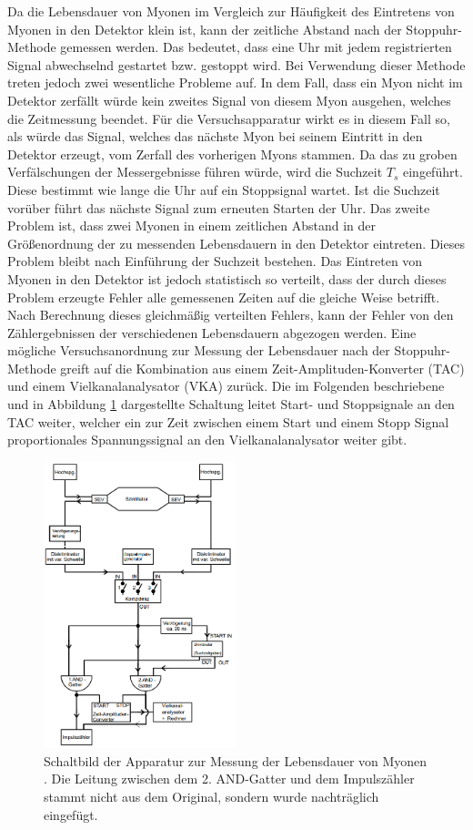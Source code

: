 Da die Lebensdauer von Myonen im Vergleich zur Häufigkeit des Eintretens von Myonen in den Detektor klein ist, kann der zeitliche Abstand nach der Stoppuhr-Methode gemessen werden.
Das bedeutet, dass eine Uhr mit jedem registrierten Signal abwechselnd gestartet bzw. gestoppt wird.
Bei Verwendung dieser Methode treten jedoch zwei wesentliche Probleme auf.
In dem Fall, dass ein Myon nicht im Detektor zerfällt würde kein zweites Signal von diesem Myon ausgehen, welches die Zeitmessung beendet.
Für die Versuchsapparatur wirkt es in diesem Fall so, als würde das Signal, welches das nächste Myon bei seinem Eintritt in den Detektor erzeugt, vom Zerfall des vorherigen Myons stammen.
Da das zu groben Verfälschungen der Messergebnisse führen würde, wird die Suchzeit $T_s$ eingeführt.
Diese bestimmt wie lange die Uhr auf ein Stoppsignal wartet.
Ist die Suchzeit vorüber führt das nächste Signal zum erneuten Starten der Uhr.
Das zweite Problem ist, dass zwei Myonen in einem zeitlichen Abstand in der Größenordnung der zu messenden Lebensdauern in den Detektor eintreten.
Dieses Problem bleibt nach Einführung der Suchzeit bestehen.
Das Eintreten von Myonen in den Detektor ist jedoch statistisch so verteilt, dass der durch dieses Problem erzeugte Fehler alle gemessenen Zeiten auf die gleiche Weise betrifft.
Nach Berechnung dieses gleichmäßig verteilten Fehlers, kann der Fehler von den Zählergebnissen der verschiedenen Lebensdauern abgezogen werden.
Eine mögliche Versuchsanordnung zur Messung der Lebensdauer nach der Stoppuhr-Methode greift auf die Kombination aus einem Zeit-Amplituden-Konverter (TAC) und einem Vielkanalanalysator (VKA) zurück.
Die im Folgenden beschriebene und in Abbildung \ref{fig:t:1} dargestellte Schaltung leitet Start- und Stoppsignale an den TAC weiter, welcher ein zur Zeit zwischen einem Start und einem Stopp Signal proportionales Spannungssignal an den Vielkanalanalysator weiter gibt.
\begin{figure}
\centering
\includegraphics[width=0.5\textwidth]{content/skizzen/aufbau.png}
\caption{Schaltbild der Apparatur zur Messung der Lebensdauer von Myonen \cite{sample}. Die Leitung zwischen dem 2. AND-Gatter und dem Impulszähler stammt nicht aus dem Original, sondern wurde nachträglich eingefügt.}
\label{fig:t:1}
\end{figure}
